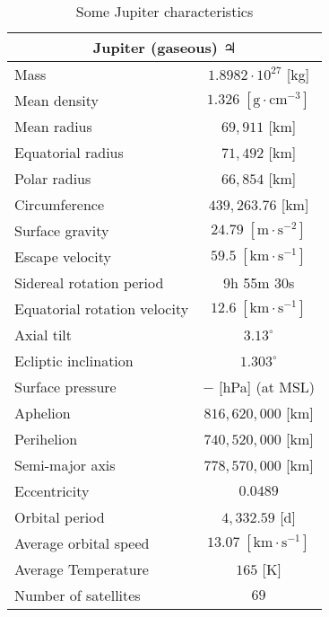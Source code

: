 	\begin{table}[H]
		\centering
		\begin{tabular}{|l|c|}
		\hline
		\multicolumn{2}{|c|}{\cellcolor[HTML]{9B9B9B}\textbf{Jupiter (gaseous) $\jupiter$}} \\ \hline
		Mass & $1.8982\cdot 10^{27}$ {[}kg{]} \\ \hline
		Mean density & $1.326\;[\text{g}\cdot \text{cm}^{-3}]$ \\ \hline
		Mean radius & $69,911$ {[}km{]} \\ \hline
		Equatorial radius & $71,492$  {[}km{]} \\ \hline
		Polar radius & $66,854$ {[}km{]} \\ \hline
		Circumference & $439,263.76$ {[}km{]} \\ \hline
		Surface gravity & $24.79\; [\text{m}\cdot \text{s}^{-2}]$ \\ \hline
		Escape velocity & $59.5 \;[\text{km}\cdot\text{s}^{-1}]$ \\ \hline
		Sidereal rotation period & 9h 55m 30s \\ \hline
		Equatorial rotation velocity & $12.6\;[\text{km}\cdot\text{s}^{-1}]$ \\ \hline
		Axial tilt & $3.13^\circ$ \\ \hline
		Ecliptic inclination & $1.303^\circ$ \\ \hline
		Surface pressure & $-$ {[}hPa{]} (at MSL) \\ \hline
		Aphelion & $816,620,000$ {[}km{]} \\ \hline
		Perihelion & $740,520,000$ {[}km{]} \\ \hline
		Semi-major axis & $778,570,000$ {[}km{]} \\ \hline
		Eccentricity & $0.0489$ \\ \hline
		Orbital period & $4,332.59$ {[}d{]} \\ \hline
		Average orbital speed & $13.07\;[\text{km}\cdot\text{s}^{-1}]$ \\ \hline
		Average Temperature & $165$ {[}K{]} \\ \hline
		Number of satellites & $69$ \\ \hline
		\end{tabular}
		\caption{Some Jupiter characteristics}
	\end{table}
	
